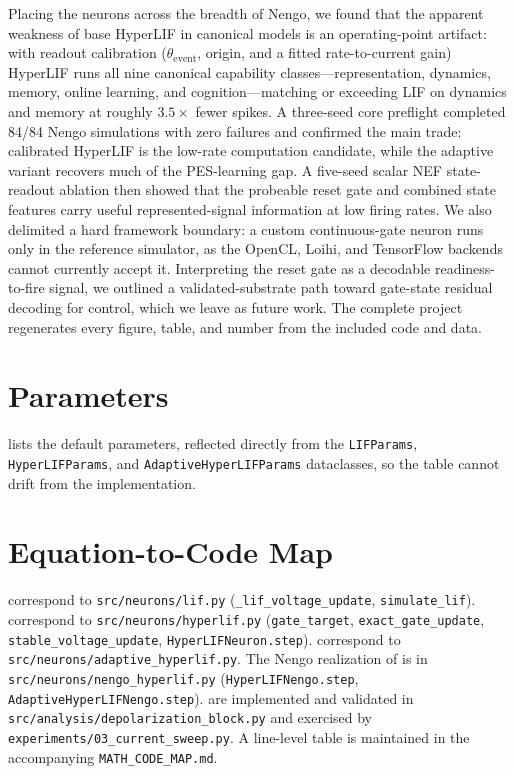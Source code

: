 \documentclass[11pt]{article}
\newcommand{\thetaevent}{\theta_{\mathrm{event}}}
\newcommand{\code}[1]{\texttt{#1}}
\begin{document}
Placing the neurons across the breadth of Nengo, we found that the apparent
weakness of base HyperLIF in canonical models is an operating-point artifact:
with readout calibration (\(\thetaevent\), origin, and a fitted rate-to-current
gain) HyperLIF runs all nine canonical capability classes---representation,
dynamics, memory, online learning, and cognition---matching or exceeding LIF on
dynamics and memory at roughly \(3.5\times\) fewer spikes. A three-seed core
preflight completed 84/84 Nengo simulations with zero failures and confirmed the
main trade: calibrated HyperLIF is the low-rate computation candidate, while the
adaptive variant recovers much of the PES-learning gap. A five-seed scalar NEF
state-readout ablation then showed that the probeable reset gate and combined
state features carry useful represented-signal information at low firing rates.
We also delimited a hard
framework
boundary: a custom continuous-gate neuron runs only in the reference simulator,
as the OpenCL, Loihi, and TensorFlow backends cannot currently accept it.
Interpreting the reset gate as a decodable readiness-to-fire signal, we outlined
a validated-substrate path toward gate-state residual decoding for control, which
we leave as future work. The complete project
regenerates every figure, table, and number from the included code and data.

\appendix
\section{Parameters}\label{app:params}
 lists the default parameters, reflected directly from the
\code{LIFParams}, \code{HyperLIFParams}, and \code{AdaptiveHyperLIFParams}
dataclasses, so the table cannot drift from the implementation.


\section{Equation-to-Code Map}\label{app:map}
\begin{sloppypar}
 correspond to \code{src/neurons/lif.py}
(\code{\_lif\_voltage\_update}, \code{simulate\_lif}).
 correspond to \code{src/neurons/hyperlif.py}
(\code{gate\_target}, \code{exact\_gate\_update}, \code{stable\_voltage\_update},
\code{HyperLIFNeuron.step}).
 correspond to
\code{src/neurons/adaptive\_hyperlif.py}.
The Nengo realization of  is in
\code{src/neurons/nengo\_hyperlif.py} (\code{HyperLIFNengo.step},
\code{AdaptiveHyperLIFNengo.step}).
 are implemented and validated in
\code{src/analysis/depolarization\_block.py} and exercised by
\code{experiments/03\_current\_sweep.py}. A line-level table is maintained in
the accompanying \code{MATH\_CODE\_MAP.md}.
\end{sloppypar}
\end{document}
